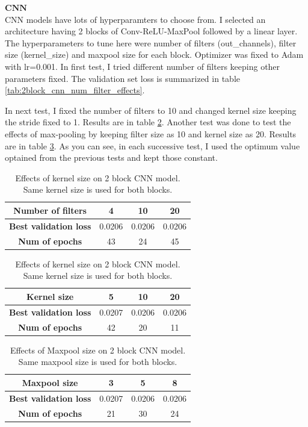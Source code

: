 \documentclass[11pt]{article}
\newcommand{\mbf}[1]{{\mathbf{#1}}}
\begin{document}
$\mbf{CNN}$ \\

CNN models have lots of hyperparamters to choose from. I selected an architecture having 2 blocks of Conv-ReLU-MaxPool followed by a linear layer. The hyperparameters to tune here were number of filters (out\_channels), filter size (kernel\_size) and maxpool size for each block. Optimizer was fixed to Adam with lr=0.001. In first test, I tried different number of filters keeping other parameters fixed. The validation set loss is summarized in table \ref{tab:2block_cnn_num_filter_effects}.

In next test, I fixed the number of filters to 10 and changed kernel size keeping the stride fixed to 1. Results are in table \ref{tab:2block_cnn_kernel_size_effects}. Another test was done to test the effects of max-pooling by keeping filter size as 10 and kernel size as 20. Results are in table \ref{tab:2block_cnn_maxpool_size_effects}. As you can see, in each successive test, I used the optimum value optained from the previous tests and kept those constant.

\begin{table}
	\parbox{.45\linewidth}{
		\centering
		\begin{tabular}{c|c|c|c}
			\textbf{Number of filters} & 4 & \bf10 & 20\\
			\hline
			\textbf{Best validation loss} & 0.0206 & 0.0206 & 0.0206\\
			\hline
			\textbf{Num of epochs} & 43 & 24 & 45
		\end{tabular}
		\caption{Effects of filter size on 2 block CNN model. Same filter size is used for both blocks.}
		\label{tab:2block_cnn_num_filter_effects}
	}
	\hfill
	\parbox{.45\linewidth}{
		\centering
		\begin{tabular}{c|c|c|c} %
			\textbf{Kernel size} & 5 & \bf10 & 20\\
			\hline
			\textbf{Best validation loss} & 0.0207 & 0.0206 & 0.0206\\
			\hline
			\textbf{Num of epochs} & 42 & 20 & 11
		\end{tabular}
		\caption{Effects of kernel size on 2 block CNN model. Same kernel size is used for both blocks.}
		\label{tab:2block_cnn_kernel_size_effects}
	}
\end{table}

\begin{table}[h!]
	\begin{center}
		\begin{tabular}{c|c|c|c} %
			\textbf{Maxpool size} & \bf3 & 5 & 8\\
			\hline
			\textbf{Best validation loss} & 0.0207 & 0.0206 & 0.0206\\
			\hline
			\textbf{Num of epochs} & 21 & 30 & 24
		\end{tabular}
		\caption{Effects of Maxpool size on 2 block CNN model. Same maxpool size is used for both blocks.}
		\label{tab:2block_cnn_maxpool_size_effects}
	\end{center}
\end{table}
\end{document}
